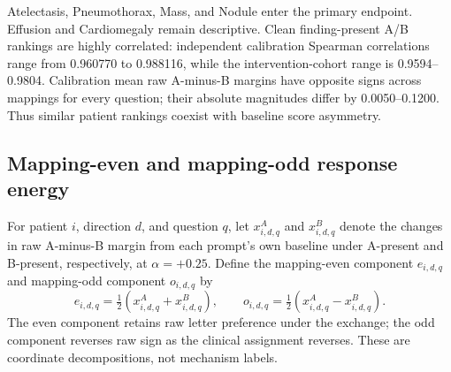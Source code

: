\begin{table}[H]
\centering
\caption{Independent answer-encoding capability calibration.}
\label{tab:encoding-calibration}
\end{table}

Atelectasis, Pneumothorax, Mass, and Nodule enter the primary endpoint.
Effusion and Cardiomegaly remain descriptive. Clean finding-present A/B
rankings are highly correlated: independent calibration Spearman
correlations range from 0.960770 to 0.988116, while the intervention-cohort
range is 0.9594--0.9804. Calibration mean raw A-minus-B margins have
opposite signs across mappings for every question; their absolute
magnitudes differ by 0.0050--0.1200. Thus similar patient rankings coexist
with baseline score asymmetry.

\subsection{Mapping-even and mapping-odd response energy}

For patient $i$, direction $d$, and question $q$, let $x^A_{i,d,q}$ and
$x^B_{i,d,q}$ denote the changes in raw A-minus-B margin from each prompt's
own baseline under A-present and B-present, respectively, at
$\alpha=+0.25$. Define the mapping-even component $e_{i,d,q}$ and
mapping-odd component $o_{i,d,q}$ by
\begin{equation}
e_{i,d,q}=\tfrac12(x^A_{i,d,q}+x^B_{i,d,q}),\qquad
o_{i,d,q}=\tfrac12(x^A_{i,d,q}-x^B_{i,d,q}).
\label{eq:encoding-components}
\end{equation}
The even component retains raw letter preference under the exchange; the
odd component reverses raw sign as the clinical assignment reverses.
These are coordinate decompositions, not mechanism labels.

